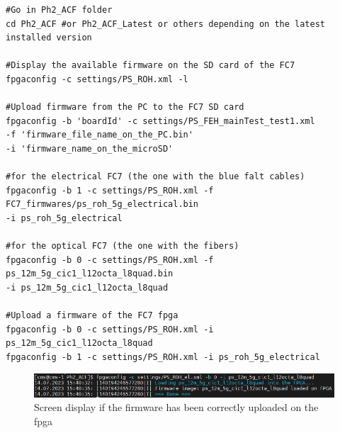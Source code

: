 \documentclass[10pt,a4paper]{article}
\begin{document}
\begin{framed}
\begin{verbatim}
#Go in Ph2_ACF folder
cd Ph2_ACF #or Ph2_ACF_Latest or others depending on the latest installed version

#Display the available firmware on the SD card of the FC7
fpgaconfig -c settings/PS_ROH.xml -l

#Upload firmware from the PC to the FC7 SD card
fpgaconfig -b 'boardId' -c settings/PS_FEH_mainTest_test1.xml 
-f 'firmware_file_name_on_the_PC.bin' 
-i 'firmware_name_on_the_microSD'

#for the electrical FC7 (the one with the blue falt cables)
fpgaconfig -b 1 -c settings/PS_ROH.xml -f FC7_firmwares/ps_roh_5g_electrical.bin 
-i ps_roh_5g_electrical

#for the optical FC7 (the one with the fibers)
fpgaconfig -b 0 -c settings/PS_ROH.xml -f ps_12m_5g_cic1_l12octa_l8quad.bin 
-i ps_12m_5g_cic1_l12octa_l8quad

#Upload a firmware of the FC7 fpga
fpgaconfig -b 0 -c settings/PS_ROH.xml -i  ps_12m_5g_cic1_l12octa_l8quad
fpgaconfig -b 1 -c settings/PS_ROH.xml -i ps_roh_5g_electrical
\end{verbatim}
\end{framed}

\begin{figure}[h!]
\centering
 \includegraphics[width=\linewidth]{firmware-writing.png} 
  \caption{Screen display if the firmware has been correctly uploaded on the fpga}
\end{figure}
\end{document}
